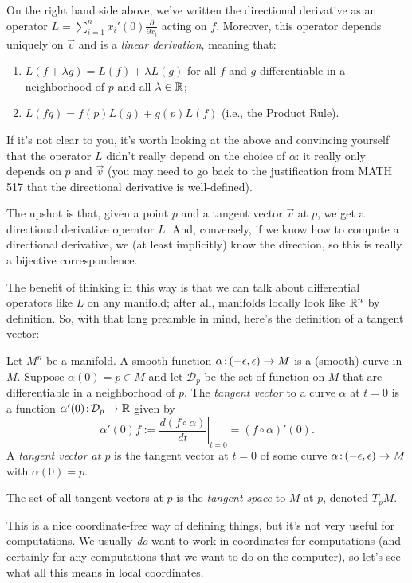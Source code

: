 On the right hand side above, we've written the directional derivative as an operator $L = \sum_{i=1}^n x_i'(0) \frac{\partial}{\partial x_i}$ acting on $f$. Moreover, this operator depends uniquely on $\vec{v}$ and is a \emph{linear derivation}, meaning that:
\begin{enumerate}
	\item $L(f + \lambda g) = L(f) + \lambda L(g)$ for all $f$ and $g$ differentiable in a neighborhood of $p$ and all $\lambda \in \mathbb{R}$;
	\item $L(f g) = f(p) L(g) + g(p) L(f)$ (i.e., the Product Rule).
\end{enumerate}

If it's not clear to you, it's worth looking at the above and convincing yourself that the operator $L$ didn't really depend on the choice of $\alpha$: it really only depends on $p$ and $\vec{v}$ (you may need to go back to the justification from MATH 517 that the directional derivative is well-defined).

The upshot is that, given a point $p$ and a tangent vector $\vec{v}$ at $p$, we get a directional derivative operator $L$. And, conversely, if we know how to compute a directional derivative, we (at least implicitly) know the direction, so this is really a bijective correspondence.

The benefit of thinking in this way is that we can talk about differential operators like $L$ on any manifold; after all, manifolds locally look like $\mathbb{R}^n$ by definition. So, with that long preamble in mind, here's the definition of a tangent vector:

\begin{definition}\label{def:tangent vector}
	Let $M^n$ be a manifold. A smooth function $\alpha\colon\thinspace\!\! (-\epsilon, \epsilon) \to M$ is a (smooth) curve in $M$. Suppose $\alpha(0) = p \in M$ and let $\mathcal{D}_p$ be the set of function on $M$ that are differentiable in a neighborhood of $p$. The \emph{tangent vector} to a curve $\alpha$ at $t=0$ is a function $\alpha'(0)\colon\thinspace\!\! \mathcal{D}_p \to \mathbb{R}$ given by
	\[
		\alpha'(0)f := \left. \frac{d(f\circ \alpha)}{dt} \right|_{t=0} = (f\circ \alpha)'(0).
	\] 
	A \emph{tangent vector at $p$} is the tangent vector at $t=0$ of some curve $\alpha\colon\thinspace\!\! (-\epsilon, \epsilon) \to M$ with $\alpha(0) = p$.
	
	The set of all tangent vectors at $p$ is the \emph{tangent space} to $M$ at $p$, denoted $T_pM$.
\end{definition}

This is a nice coordinate-free way of defining things, but it's not very useful for computations. We usually \emph{do} want to work in coordinates for computations (and certainly for any computations that we want to do on the computer), so let's see what all this means in local coordinates.

